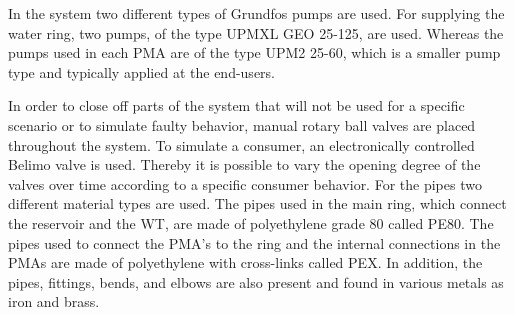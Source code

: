 % 		 

In the system two different types of Grundfos pumps are used. For supplying the water ring, two pumps, of the type UPMXL GEO 25-125\cite{waterpump1}, are used. Whereas the pumps used in each PMA are of the type UPM2 25-60\cite{waterpump2}, which is a smaller pump type and typically applied at the end-users. 

In order to close off parts of the system that will not be used for a specific scenario or to simulate faulty behavior, manual rotary ball valves are placed throughout the system. 
To simulate a consumer, an electronically controlled Belimo valve is used. Thereby it is possible to vary the opening degree of the valves over time according to a specific consumer behavior. 
For the pipes two different material types are used. The pipes used in the main ring, which connect the reservoir and the WT, are made of polyethylene grade 80 called PE80\cite{PE100}.
 The pipes used to connect the PMA's to the ring and the internal connections in the PMAs are made of polyethylene with cross-links called PEX. In addition, the pipes, fittings, bends, and elbows are also present and found in various metals as iron and brass.     

